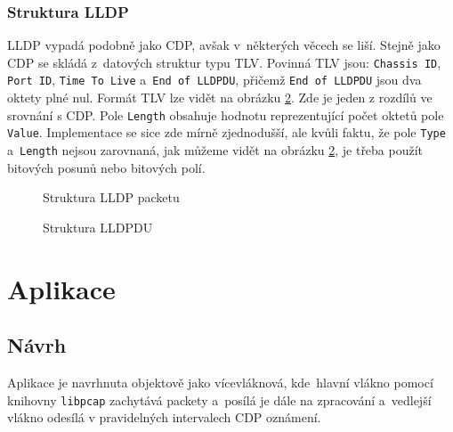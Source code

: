 \documentclass[a4paper,12pt]{article}
\begin{document}
			\subsubsection{Struktura LLDP}
				LLDP vypadá podobně jako CDP, avšak v~některých věcech se liší. Stejně jako CDP se skládá z~datových struktur typu TLV. Povinná TLV jsou: \texttt{Chassis ID}, \texttt{Port ID}, \texttt{Time To Live} a~\texttt{End of LLDPDU}, přičemž \texttt{End of LLDPDU} jsou dva oktety plné nul. Formát TLV lze vidět na obrázku \ref{pic:lldpTlvStructure}. Zde je jeden z rozdílů ve srovnání s CDP. Pole \texttt{Length} obsahuje hodnotu reprezentující počet oktetů pole \texttt{Value}. Implementace se sice zde mírně zjednodušší, ale kvůli faktu, že pole \texttt{Type} a~\texttt{Length} nejsou zarovnaná, jak můžeme vidět na obrázku \ref{pic:lldpTlvStructure}, je třeba použít bitových posunů nebo bitových polí.
				
				\begin{figure}[h]	
					\begin{center}
						\caption{Struktura LLDP packetu}
						\label{pic:lldpStructure}
					\end{center}
				\end{figure}
				
				\begin{figure}[h]	
					\begin{center}
						\caption{Struktura LLDPDU}
						\label{pic:lldpTlvStructure}
					\end{center}
				\end{figure}
			
			\pagebreak
			
	\section{Aplikace}
	\subsection{Návrh}
		Aplikace je navrhnuta objektově jako vícevláknová, kde~hlavní vlákno pomocí knihovny \texttt{libpcap} zachytává packety a~posílá je dále na zpracování a~vedlejší vlákno odesílá v pravidelných intervalech CDP oznámení.
	
\end{document}
